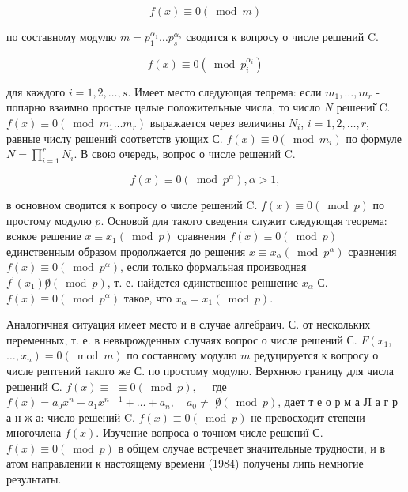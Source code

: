 \documentclass[10pt]{article}
\begin{document}
\[

f(x) \equiv 0(\bmod m)

\]



по составному модулю $m=p_{1}^{\alpha_{1}} \ldots p_{s}^{\alpha_{s}}$ сводится к вопросу о числе решений $\mathrm{C}$.



\[

f(x) \equiv 0\left(\bmod p_{i}^{\alpha_{i}}\right)

\]



для каждого $i=1,2, \ldots, s$. Имеет место следующая теорема: если $m_{1}, \ldots, m_{r}$ - попарно взаимно простые целые положительные числа, то число $N$ решениі̆ $\mathrm{C}$. $f(x) \equiv 0\left(\bmod m_{1} \ldots m_{r}\right)$ выражается через величины $N_{i}$, $i=1,2, \ldots, r$, равные числу решений соответств ующих С. $f(x) \equiv 0\left(\bmod m_{i}\right)$ по формуле $N=\prod_{i=1}^{r} N_{i}$. В свою очередь, вопрос о числе решений $\mathrm{C}$.



\[

f(x) \equiv 0\left(\bmod p^{\alpha}\right), \alpha>1,

\]



в основном сводится к вопросу о числе решений $\mathrm{C}$. $f(x) \equiv 0(\bmod p)$ по простому модулю $p$. Основой для такого сведения служит следующая теорема: всякое решение $x \equiv x_{1}(\bmod p)$ сравнения $f(x) \equiv 0(\bmod p)$ единственным образом продолжается до решения $x \equiv x_{\alpha}\left(\bmod p^{\alpha}\right)$ сравнения $f(x) \equiv 0\left(\bmod p^{\alpha}\right)$, если только формальная производная $f^{\prime}\left(x_{1}\right) \not 0(\bmod p)$, т. е. найдется единственное реншение $x_{\alpha}$ С. $f(x) \equiv 0\left(\bmod p^{\alpha}\right)$ такое, что $x_{\alpha}=x_{1}(\bmod p)$.



Аналогичная ситуация имеет место и в случае алгебраич. С. от нескольких переменных, т. е. в невырожденных случаях вопрос о числе решений С. $F\left(x_{1}\right.$, $\left.\ldots, x_{n}\right)=0(\bmod m)$ по составному модулю $m$ редуцируется к вопросу о числе рептений такого же С. по простому модулю. Верхнюю границу для числа решений С. $f(x) \equiv$ $\equiv 0(\bmod p), \quad$ где $f(x)=a_{0} x^{n}+a_{1} x^{n-1}+\ldots+a_{n}, \quad a_{0} \neq$ $\not 0(\bmod p)$, дает т е о р м а ЈI а г р а н ж а: число решений $\mathrm{C}$. $f(x) \equiv 0(\bmod p)$ не превосходит степени многочлена $f(x)$. Изучение вопроса о точном числе решениї С. $f(x) \equiv 0(\bmod p)$ в общем случае встречает значительные трудности, и в атом направлении к настоящему времени (1984) получены липь немногие результаты.
\end{document}
